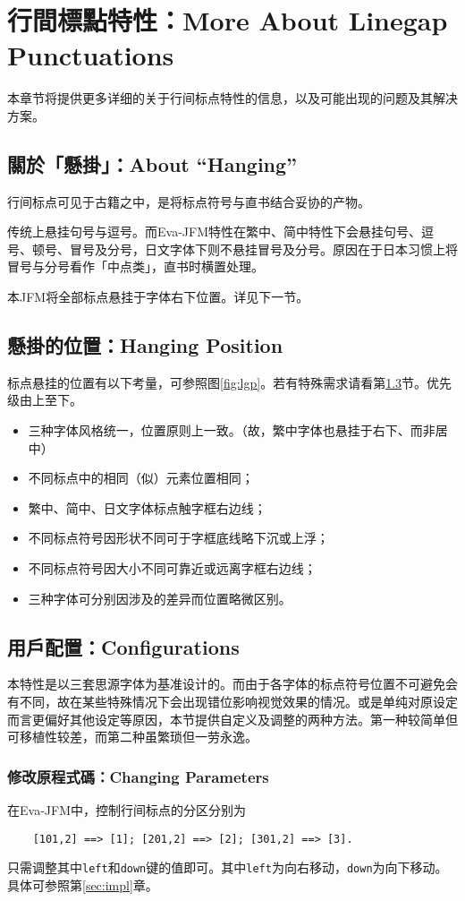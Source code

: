 \documentclass{ltjsarticle}
\def\段{\par}
\begin{document}
\section{行間標點特性：More About Linegap Punctuations}\label{sec:lgp}
本章节将提供更多详细的关于行间标点特性的信息，以及可能出现的问题及其解决方案。

\subsection{關於「懸掛」：About ``Hanging''}
行间标点可见于古籍之中，是将标点符号与直书结合妥协的产物。\段
传统上悬挂句号与逗号。而\textsf{Eva-JFM}特性在繁中、简中特性下会悬挂句号、逗号、顿号、冒号及分号，日文字体下则不悬挂冒号及分号。原因在于日本习惯上将冒号与分号看作「中点类」，直书时横置处理。\段
本JFM将全部标点悬挂于字体右下位置。详见下一节。

\subsection{懸掛的位置：Hanging Position}
标点悬挂的位置有以下考量，可参照图\ref{fig:lgp}。若有特殊需求请看第\ref{sec:config}节。优先级由上至下。
\begin{itemize}
    \item 三种字体风格统一，位置原则上一致。（故，繁中字体也悬挂于右下、而非居中）
    \item 不同标点中的相同（似）元素位置相同；
    \item 繁中、简中、日文字体标点触字框右边线；
    \item 不同标点符号因形状不同可于字框底线略下沉或上浮；
    \item 不同标点符号因大小不同可靠近或远离字框右边线；
    \item 三种字体可分别因涉及的差异而位置略微区别。
\end{itemize}

\subsection{用戶配置：Configurations}\label{sec:config}
本特性是以三套思源字体为基准设计的。而由于各字体的标点符号位置不可避免会有不同，故在某些特殊情况下会出现错位影响视觉效果的情况。或是单纯对原设定而言更偏好其他设定等原因，本节提供自定义及调整的两种方法。第一种较简单但可移植性较差，而第二种虽繁琐但一劳永逸。

\subsubsection{修改原程式碼：Changing Parameters}
在\textsf{Eva-JFM}中，控制行间标点的分区分别为
\begin{lstlisting}
    [101,2] ==> [1]; [201,2] ==> [2]; [301,2] ==> [3].
\end{lstlisting}
只需调整其中\texttt{left}和\texttt{down}键的值即可。其中\texttt{left}为向右移动，\texttt{down}为向下移动。
具体可参照第\ref{sec:impl}章。
\end{document}
